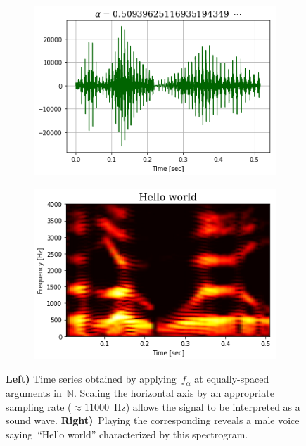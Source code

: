 \documentclass{article}
\begin{document}
\begin{figure}
\centering
\begin{subfigure}{.5\textwidth}
  \centering
  \includegraphics[width=\linewidth]{resources/audio/generated/generated_waveform.png}
\end{subfigure}%
\begin{subfigure}{.5\textwidth}
  \centering
  \includegraphics[width=\linewidth]{resources/audio/generated/generated_spectrogram.png}
\end{subfigure}
\caption{{\bf Left)} Time series obtained by applying~$f_\alpha$ at equally-spaced arguments in~$\mathbb{N}$.  Scaling the horizontal axis by an appropriate sampling rate ($\approx 11000$~Hz) allows the signal to be interpreted as a sound wave. {\bf Right)}~Playing the corresponding  reveals a male voice saying~``Hello world'' characterized by this spectrogram.}
\label{fig:helloWorld}
\end{figure}
\end{document}
